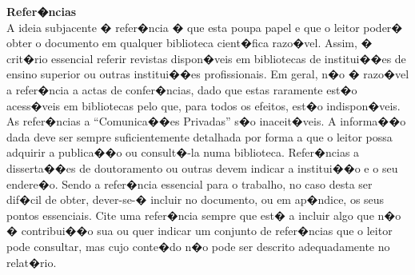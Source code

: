 \textbf{Refer�ncias}\\
A ideia subjacente � refer�ncia � que esta poupa papel e que o leitor poder� obter o documento em qualquer biblioteca cient�fica razo�vel. Assim, � crit�rio essencial referir revistas dispon�veis em bibliotecas de institui��es de ensino superior ou outras institui��es profissionais. Em geral, n�o � razo�vel a refer�ncia a actas de confer�ncias, dado que estas raramente est�o acess�veis em bibliotecas pelo que, para todos os efeitos, est�o indispon�veis. As refer�ncias a ``Comunica��es Privadas'' s�o inaceit�veis. A informa��o dada deve ser sempre suficientemente detalhada por forma a que o leitor possa adquirir a publica��o ou consult�-la numa biblioteca. Refer�ncias a disserta��es de doutoramento ou outras devem indicar a institui��o e o seu endere�o. Sendo a refer�ncia essencial para o trabalho, no caso desta ser dif�cil de obter, dever-se-� incluir no documento, ou em ap�ndice, os seus pontos essenciais.
Cite uma refer�ncia sempre que est� a incluir algo que n�o � contribui��o sua ou quer indicar um conjunto de refer�ncias que o leitor pode consultar, mas cujo conte�do n�o pode ser descrito adequadamente no relat�rio.
